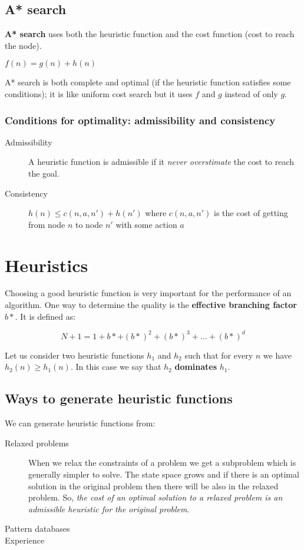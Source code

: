 \documentclass[a4paper, 11pt]{article}
\begin{document}
\subsection*{A* search}
\textbf{A* search} uses both the heuristic function and the cost function (cost to reach the node).

\indent $f(n) = g(n) + h(n)$

A* search is both complete and optimal (if the heuristic function satisfies some conditions); it is like uniform cost search but it uses $f$ and $g$ instead of only $g$.

\subsubsection*{Conditions for optimality: admissibility and consistency}
\begin{description}
  \item[Admissibility] A heuristic function is admissible if it \emph{never overstimate} the cost to reach the goal.
  \item[Consistency] $h(n) \le c(n, a, n') + h(n')$ where $c(n, a, n')$ is the cost of getting from node $n$ to node $n'$ with some action $a$
\end{description}

\section{Heuristics}
Choosing a good heuristic function is very important for the performance of an algorithm. One way to determine the quality is the \textbf{effective branching factor} $b*$.
It is defined as:

\[ N + 1 = 1 + b* + (b*)^2 + (b*)^3 + \ldots + (b*)^d \]

Let us consider two heuristic functions $h_1$ and $h_2$ such that for every $n$ we have $h_2(n) \ge h_1(n)$. In this case we say that $h_2$ \textbf{dominates} $h_1$.

\subsection*{Ways to generate heuristic functions}
We can generate heuristic functions from:
\begin{description}
  \item[Relaxed problems] When we relax the constraints of a problem we get a subproblem which is generally simpler to solve. The state space grows and if there is an optimal solution in the original problem then there will be also in the relaxed problem. So, \emph{the cost of an optimal solution to a relaxed problem is an admissible heuristic for the original problem}.
  \item[Pattern databases]
  \item[Experience]
\end{description}
\end{document}
